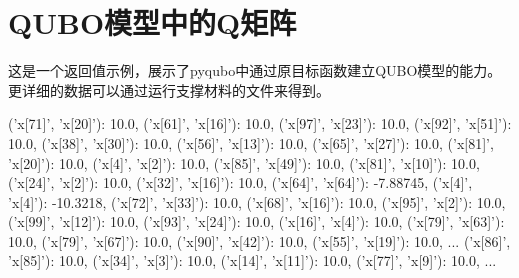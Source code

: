 \documentclass{MathorCupmodeling}
\begin{document}
\section{QUBO模型中的Q矩阵}
这是一个返回值示例，展示了pyqubo中通过原目标函数建立QUBO模型的能力。更详细的数据可以通过运行支撑材料的文件来得到。
\begin{python}
{('x[71]', 'x[20]'): 10.0,
 ('x[61]', 'x[16]'): 10.0,
 ('x[97]', 'x[23]'): 10.0,
 ('x[92]', 'x[51]'): 10.0,
 ('x[38]', 'x[30]'): 10.0,
 ('x[56]', 'x[13]'): 10.0,
 ('x[65]', 'x[27]'): 10.0,
 ('x[81]', 'x[20]'): 10.0,
 ('x[4]', 'x[2]'): 10.0,
 ('x[85]', 'x[49]'): 10.0,
 ('x[81]', 'x[10]'): 10.0,
 ('x[24]', 'x[2]'): 10.0,
 ('x[32]', 'x[16]'): 10.0,
 ('x[64]', 'x[64]'): -7.88745,
 ('x[4]', 'x[4]'): -10.3218,
 ('x[72]', 'x[33]'): 10.0,
 ('x[68]', 'x[16]'): 10.0,
 ('x[95]', 'x[2]'): 10.0,
 ('x[99]', 'x[12]'): 10.0,
 ('x[93]', 'x[24]'): 10.0,
 ('x[16]', 'x[4]'): 10.0,
 ('x[79]', 'x[63]'): 10.0,
 ('x[79]', 'x[67]'): 10.0,
 ('x[90]', 'x[42]'): 10.0,
 ('x[55]', 'x[19]'): 10.0,
...
 ('x[86]', 'x[85]'): 10.0,
 ('x[34]', 'x[3]'): 10.0,
 ('x[14]', 'x[11]'): 10.0,
 ('x[77]', 'x[9]'): 10.0,
 ...}
 \end{python}
\end{document}
